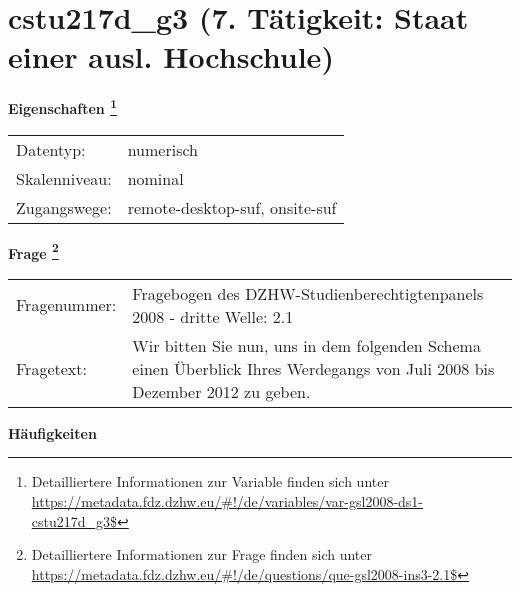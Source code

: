 
    \setcounter{footnote}{0}

    \vspace*{-1.8cm}
	\section{cstu217d\_g3 (7. Tätigkeit: Staat einer ausl. Hochschule)}
	\label{section:cstu217d_g3}



    \vspace*{0.5cm}
    \noindent\textbf{Eigenschaften
	\footnote{Detailliertere Informationen zur Variable finden sich unter
		\url{https://metadata.fdz.dzhw.eu/\#!/de/variables/var-gsl2008-ds1-cstu217d_g3$}}}\\
	\begin{tabularx}{\hsize}{@{}lX}
	Datentyp: & numerisch \\
	Skalenniveau: & nominal \\
	Zugangswege: &
	  remote-desktop-suf, 
	  onsite-suf
 \\
    \end{tabularx}



				\vspace*{0.5cm}
                \noindent\textbf{Frage
	                \footnote{Detailliertere Informationen zur Frage finden sich unter
		              \url{https://metadata.fdz.dzhw.eu/\#!/de/questions/que-gsl2008-ins3-2.1$}}}\\
				\begin{tabularx}{\hsize}{@{}lX}
					Fragenummer: &
					  Fragebogen des DZHW-Studienberechtigtenpanels 2008 - dritte Welle:
					  2.1
 \\
					Fragetext: & Wir bitten Sie nun, uns in dem folgenden Schema einen Überblick Ihres Werdegangs von Juli 2008 bis Dezember 2012 zu geben. \\
				\end{tabularx}





        		\vspace*{0.5cm}
                \noindent\textbf{Häufigkeiten}

